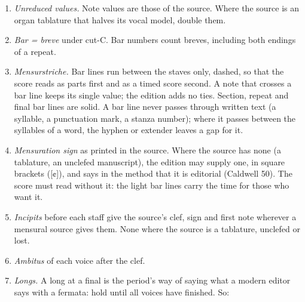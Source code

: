 \begin{enumerate}

\tightlist
\item
  \textit{Unreduced values.} Note values are those of the source. Where the source is an organ tablature that halves its vocal model, double them.
\item
  \textit{Bar = breve} under cut-C. Bar numbers count breves, including both endings of a repeat.
\item
  \textit{Mensurstriche.} Bar lines run between the staves only, dashed, so that the score reads as parts first and as a timed score second. A note that crosses a bar line keeps its single value; the edition adds no ties. Section, repeat and final bar lines are solid. A bar line never passes through written text (a syllable, a punctuation mark, a stanza number); where it passes between the syllables of a word, the hyphen or extender leaves a gap for it.
\item
  \textit{Mensuration sign} as printed in the source. Where the source has none (a tablature, an unclefed manuscript), the edition may supply one, in square brackets ({[}¢{]}), and says in the method that it is editorial (Caldwell 50). The score must read without it: the light bar lines carry the time for those who want it.
\item
  \textit{Incipits} before each staff give the source's clef, sign and first note wherever a mensural source gives them. None where the source is a tablature, unclefed or lost.
\item
  \textit{Ambitus} of each voice after the clef.
\item
  \textit{Longs.} A long at a final is the period's way of saying what a modern editor says with a fermata: hold until all voices have finished. So:


\end{enumerate}
